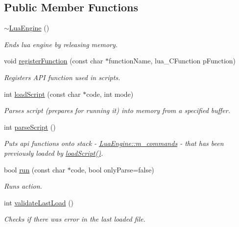 \subsection*{Public Member Functions}
\begin{DoxyCompactItemize}
\item 
\hyperlink{class_lua_engine_ac72949ef59ee17465ce653f0c02c3eab}{$\sim$\-Lua\-Engine} ()
\begin{DoxyCompactList}\small\item\em Ends lua engine by releasing memory. \end{DoxyCompactList}\item 
void \hyperlink{class_lua_engine_a03530362918aceccd6f69a5cecf2a968}{register\-Function} (const char $\ast$function\-Name, lua\-\_\-\-C\-Function p\-Function)
\begin{DoxyCompactList}\small\item\em Registers A\-P\-I function used in scripts. \end{DoxyCompactList}\item 
int \hyperlink{class_lua_engine_aab9337ae5ea59bccc1e08c4015d42700}{load\-Script} (const char $\ast$code, int mode)
\begin{DoxyCompactList}\small\item\em Parses script (prepares for running it) into memory from a specified buffer. \end{DoxyCompactList}\item 
int \hyperlink{class_lua_engine_a5eae05f78704166f098ea20568c23fd7}{parse\-Script} ()
\begin{DoxyCompactList}\small\item\em Puts api functions onto stack -\/ \hyperlink{class_lua_engine_a86a3f32127e36e1ccce6c5a42a298ad5}{Lua\-Engine\-::m\-\_\-commands} -\/ that has been previously loaded by \hyperlink{class_lua_engine_aab9337ae5ea59bccc1e08c4015d42700}{load\-Script()}. \end{DoxyCompactList}\item 
bool \hyperlink{class_lua_engine_a38430b2be86fac999acd740423ec1fc8}{run} (const char $\ast$code, bool only\-Parse=false)
\begin{DoxyCompactList}\small\item\em Runs action. \end{DoxyCompactList}\item 
int \hyperlink{class_lua_engine_ab039ca83afd2466f9fe52fcc69adfefb}{validate\-Last\-Load} ()
\begin{DoxyCompactList}\small\item\em Checks if there was error in the last loaded file. \end{DoxyCompactList}\item 

\end{DoxyCompactItemize}

